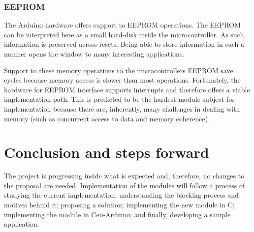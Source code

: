 \documentclass{article}
\begin{document}
\subsubsection{EEPROM}
\tab The Arduino hardware offers support to EEPROM operations. The EEPROM can be interpreted here as a small hard-disk inside the microcontroller. As such, information is preserved across resets. Being able to store information in such a manner opens the window to many interesting applications. 
\par Support to these memory operations to the microcontrollers EEPROM save cycles because memory access is slower than most operations. Fortunately, the hardware for EEPROM interface supports interrupts and therefore offers a viable implementation path. This is predicted to be the hardest module subject for implementation because there are, inherently, many challenges in dealing with memory (such as concurrent access to data and memory coherence).

\section{Conclusion and steps forward}
\tab The project is progressing inside what is expected and, therefore, no changes to the proposal are needed. Implementation of the modules will follow a process of studying the current implementation; understanding the blocking process and motives behind it; proposing a solution; implementing the new module in C; implementing the module in Ceu-Arduino; and finally, developing a sample application.
\end{document}
